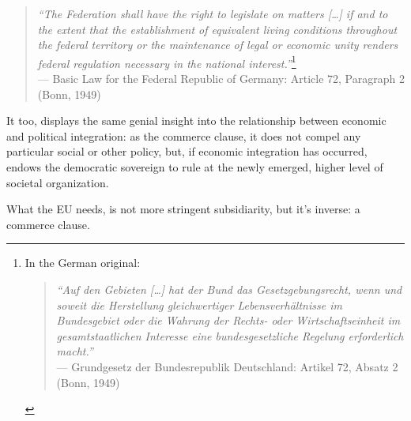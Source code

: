 \begin{quote}
	\emph{``The Federation shall have the right to legislate on matters [\ldots] if and to the extent that the establishment of equivalent living conditions throughout the federal territory or the maintenance of legal or economic unity renders federal regulation necessary in the national interest.''}\footnote{
		In the German original:
			\begin{quote}
				\emph{``Auf den Gebieten [\ldots] hat der Bund das Gesetzgebungsrecht, wenn und soweit die Herstellung gleichwertiger Lebensverhältnisse im Bundesgebiet oder die Wahrung der Rechts- oder Wirtschaftseinheit im gesamtstaatlichen Interesse eine bundesgesetzliche Regelung erforderlich macht.''}\\
				--- Grundgesetz der Bundesrepublik Deutschland: Artikel 72, Absatz 2 (Bonn, 1949)
			\end{quote}}\\
	--- Basic Law for the Federal Republic of Germany: Article 72, Paragraph 2 (Bonn, 1949)
\end{quote}

It too, displays the same genial insight into the relationship between economic and political integration: as the commerce clause, it does not compel any particular social or other policy, but, if economic integration has occurred, endows the democratic sovereign to rule at the newly emerged, higher level of societal organization.


What the \gls{EU} needs, is not more stringent subsidiarity, but it's inverse: a commerce clause.





